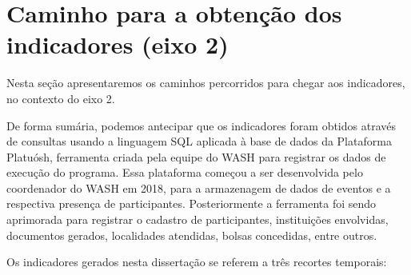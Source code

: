 \documentclass[
12pt,		%
openright,	%
twoside,  %
a4paper,			%
chapter=TITLE,		%
english,			%
french,				%
spanish,			%
brazil				%
]{USPSC-classe/USPSC}
\begin{document}
\section[Caminho para a obten\c{c}\~ao dos indicadores (eixo 2)]{Caminho para a obten\c{c}\~ao dos indicadores (eixo 2)}\label{Caminho para a obten\c{c}\~ao dos indicadores (eixo 2)}
Nesta se\c{c}\~ao apresentaremos os caminhos percorridos para chegar aos indicadores, no contexto do eixo 2.








De forma sum\'aria, podemos antecipar que os indicadores foram obtidos atrav\'es de consultas usando a linguagem SQL aplicada \`a base de dados da Plataforma Platu\'osh, ferramenta criada pela equipe do WASH para registrar os dados de execu\c{c}\~ao do programa. Essa plataforma come\c{c}ou a ser desenvolvida pelo coordenador do WASH em 2018, para a armazenagem de dados de eventos e a respectiva presen\c{c}a de participantes. Posteriormente a ferramenta foi sendo aprimorada para registrar o cadastro de participantes, institui\c{c}\~oes envolvidas, documentos gerados, localidades atendidas, bolsas concedidas, entre outros.








Os indicadores gerados nesta disserta\c{c}\~ao se referem a tr\^es recortes temporais:
\end{document}
